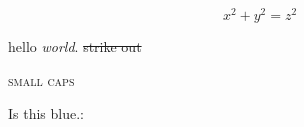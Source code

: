 \documentclass{article}
\begin{document}
$$
x^2 + y^2 = z^2
$$


%


hello \emph{world}.
\sout{strike out}

\textsc{small caps}

\color{blue}   Is this blue.:   

\end{document}
